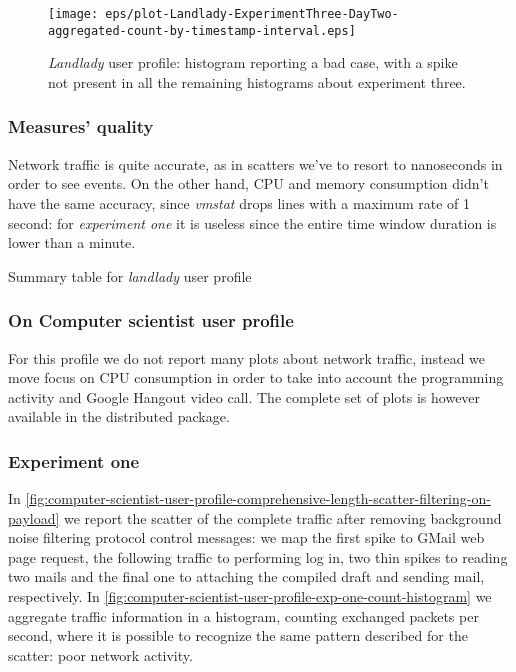 \documentclass[10pt,a4paper]{article}
\begin{document}
    \begin{figure}
      \centering
      \texttt{[image: eps/plot-Landlady-ExperimentThree-DayTwo-aggregated-count-by-timestamp-interval.eps]}
      \caption{\emph{Landlady} user profile: histogram reporting a bad
        case, with a spike not present in all the remaining histograms
        about experiment three.}
      \label{fig:landlady-user-profile-exp-three-count-histogram-odd-case}
    \end{figure}



    \subsubsection*{Measures' quality}
    Network traffic is quite accurate, as in scatters we've to resort
    to nanoseconds in order to see events. On the other hand, CPU and
    memory consumption didn't have the same accuracy, since
    \emph{vmstat} drops lines with a maximum rate of 1 second: for
    \emph{experiment one} it is useless since the entire time window
    duration is lower than a minute.
  

    \begin{table}
      \begin{adjustwidth}{-2cm}{}
        
      \end{adjustwidth}
      \caption{Summary table for \emph{landlady} user profile}
      \label{fig:landlady-user-profile}
    \end{table}

    \newpage

    \subsubsection{On Computer scientist user profile}
    For this profile we do not report many plots about network
    traffic, instead we move focus on CPU consumption in order to take
    into account the programming activity and Google Hangout video
    call. The complete set of plots is however available in the
    distributed package.
    
    \subsubsection*{Experiment one}
    In
    \autoref{fig:computer-scientist-user-profile-comprehensive-length-scatter-filtering-on-payload}
    we report the scatter of the complete traffic after removing
    background noise filtering protocol control messages: we map the
    first spike to GMail web page request, the following traffic to
    performing log in, two thin spikes to reading two mails and the
    final one to attaching the compiled draft and sending mail,
    respectively.  In
    \autoref{fig:computer-scientist-user-profile-exp-one-count-histogram}
    we aggregate traffic information in a histogram, counting
    exchanged packets per second, where it is possible to recognize
    the same pattern described for the scatter: poor network activity.
\end{document}
